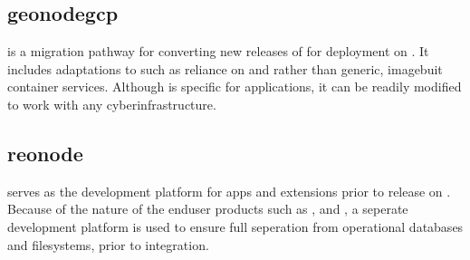 \documentclass[letterpaper,12pt,english,openany,oneside]{sphinxmanual}
\begin{document}
\subsection{geonodegcp}
\label{\detokenize{euidev/development/_autosummary/geonodegcp:module-geonodegcp}}\label{\detokenize{euidev/development/_autosummary/geonodegcp:geonodegcp}}\label{\detokenize{euidev/development/_autosummary/geonodegcp::doc}}
\sphinxAtStartPar
{\hyperref[\detokenize{_static/glossary:term-GeoNodeGCP}]{}} is a migration pathway for converting new releases of {\hyperref[\detokenize{_static/glossary:term-0}]{}} for deployment on {\hyperref[\detokenize{_static/glossary:term-GCP}]{}}. It includes adaptations to {\hyperref[\detokenize{_static/glossary:term-GCP}]{}} such as reliance on  and  rather than generic, image\sphinxhyphen{}buit container services. Although {\hyperref[\detokenize{_static/glossary:term-GeoNodeGCP}]{}} is specific for {\hyperref[\detokenize{_static/glossary:term-GCP}]{}} applications, it can be readily modified to work with any {\hyperref[\detokenize{_static/glossary:term-Kubernetes}]{}} cyber\sphinxhyphen{}infrastructure.

\sphinxstepscope


\subsection{reonode}
\label{\detokenize{euidev/development/_autosummary/reonode:module-reonode}}\label{\detokenize{euidev/development/_autosummary/reonode:reonode}}\label{\detokenize{euidev/development/_autosummary/reonode::doc}}
\sphinxAtStartPar
{\hyperref[\detokenize{_static/glossary:term-REONode}]{}} serves as the development platform for {\hyperref[\detokenize{_static/glossary:term-REON}]{}} apps and extensions prior to release on . Because of the {\hyperref[\detokenize{_static/glossary:term-CI-CD}]{}} nature of the end\sphinxhyphen{}user products such as , {\hyperref[\detokenize{_static/glossary:term-RGVFlood.com}]{}} and {\hyperref[\detokenize{_static/glossary:term-SustainRGV}]{}}, a seperate development platform is used to ensure full seperation from operational databases and filesystems, prior to integration.
\end{document}
